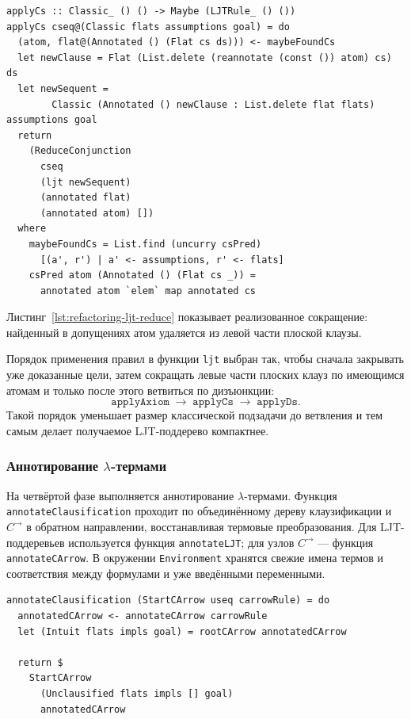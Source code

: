 \documentclass[14pt, russian]{scrartcl}
\begin{document}
\begin{listing}[!htb]
\caption{Локальное объединение каррирования и modus ponens}
\label{lst:refactoring-ljt-reduce}
\begin{verbatim}
applyCs :: Classic_ () () -> Maybe (LJTRule_ () ())
applyCs cseq@(Classic flats assumptions goal) = do
  (atom, flat@(Annotated () (Flat cs ds))) <- maybeFoundCs
  let newClause = Flat (List.delete (reannotate (const ()) atom) cs) ds
  let newSequent =
        Classic (Annotated () newClause : List.delete flat flats) assumptions goal
  return
    (ReduceConjunction
      cseq
      (ljt newSequent)
      (annotated flat)
      (annotated atom) [])
  where
    maybeFoundCs = List.find (uncurry csPred)
      [(a', r') | a' <- assumptions, r' <- flats]
    csPred atom (Annotated () (Flat cs _)) =
      annotated atom `elem` map annotated cs
\end{verbatim}
\end{listing}

Листинг~\ref{lst:refactoring-ljt-reduce} показывает реализованное сокращение:
найденный в допущениях атом удаляется из левой части плоской клаузы.

Порядок применения правил в функции \texttt{ljt} выбран так, чтобы сначала
закрывать уже доказанные цели, затем сокращать левые части плоских клауз по
имеющимся атомам и только после этого ветвиться по дизъюнкции:
\[
\texttt{applyAxiom} \;\rightarrow\; \texttt{applyCs} \;\rightarrow\;
\texttt{applyDs}.
\]
Такой порядок уменьшает размер классической подзадачи до ветвления и тем самым
делает получаемое LJT-поддерево компактнее.

\subsubsection{Аннотирование \texorpdfstring{$\lambda$}{lambda}-термами}

На четвёртой фазе выполняется аннотирование $\lambda$-термами. Функция
\texttt{annotateClausification} проходит по объединённому дереву
клаузификации и $C^{\rightarrow}$ в обратном направлении, восстанавливая
термовые преобразования. Для LJT-поддеревьев используется функция
\texttt{annotateLJT}; для узлов $C^{\rightarrow}$ --- функция
\texttt{annotateCArrow}. В окружении \texttt{Environment} хранятся свежие
имена термов и соответствия между формулами и уже введёнными переменными.

\begin{listing}[!htb]
\caption{Переход от клаузификации к аннотированному $C^{\rightarrow}$}
\label{lst:refactoring-annotate-start-carrow}
\begin{verbatim}
annotateClausification (StartCArrow useq carrowRule) = do
  annotatedCArrow <- annotateCArrow carrowRule
  let (Intuit flats impls goal) = rootCArrow annotatedCArrow

  return $
    StartCArrow
      (Unclausified flats impls [] goal)
      annotatedCArrow
\end{verbatim}
\end{listing}
\end{document}
